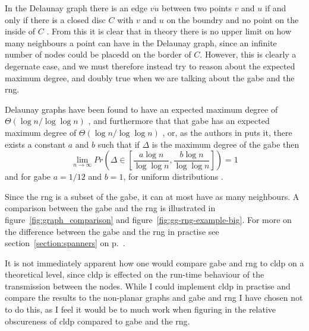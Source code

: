 
In the Delaunay graph there is an edge $\overline{vu}$ between two points $v$ and $u$ if and only if there is a closed disc $C$ with $v$ and $u$ on the boundry and no point on the inside of $C$ \cite{CompuGeo}. From this it is clear that in theory there is no upper limit on how many neighbours a point can have in the Delaunay graph, since an infinite number of nodes could be placedd on the border of $C$. However, this is clearly a degernate case, and we must therefore instead try to reason about the expected maximum degree, and doubly true when we are talking about the \ac{gabe} and the \ac{rng}.

Delaunay graphs have been found to have an expected maximum degree of $\Theta(\log n / \log \log n)$ \cite{delExpected}, and furthermore that that \ac{gabe} has an expected maximum degree of $\Theta(\log n / \log \log n)$ \cite{GGExpected}, or, as the authors in \cite{GGExpected} puts it, there exists a constant $a$ and $b$ such that if $\Delta$ is the maximum degree of the \ac{gabe} then 
$$
\lim_{n \rightarrow \infty} Pr\left({\Delta \in \left[\frac{a\log n}{\log \log n}, \frac{b\log n}{\log \log n}\right]}\right) = 1
$$
and for \ac{gabe} $a = 1/12$ and $b = 1$, for uniform distributions \cite{GGExpected}.

Since the \ac{rng} is a subset of the \ac{gabe}, it can at most have as many neighbours. A comparison between the \ac{gabe} and the \ac{rng} is illustrated in figure~\ref{fig:graph_comparison} and figure~\ref{fig:gg-rng-example-big}. For more on the difference between the \ac{gabe} and the \ac{rng} in practise see section~\ref{section:spanners} on p.~\pageref{section:spanners}.


It is not immediately apparent how one would compare \ac{gabe} and \ac{rng} to \ac{cldp} on a theoretical level, since \ac{cldp} is effected on the run-time behaviour of the transmission between the nodes. While I could implement \ac{cldp} in practise and compare the results to the non-planar graphs and \ac{gabe} and \ac{rng} I have chosen not to do this, as I feel it would be to much work when figuring in the relative obscureness of \ac{cldp} compared to \ac{gabe} and the \ac{rng}.  

